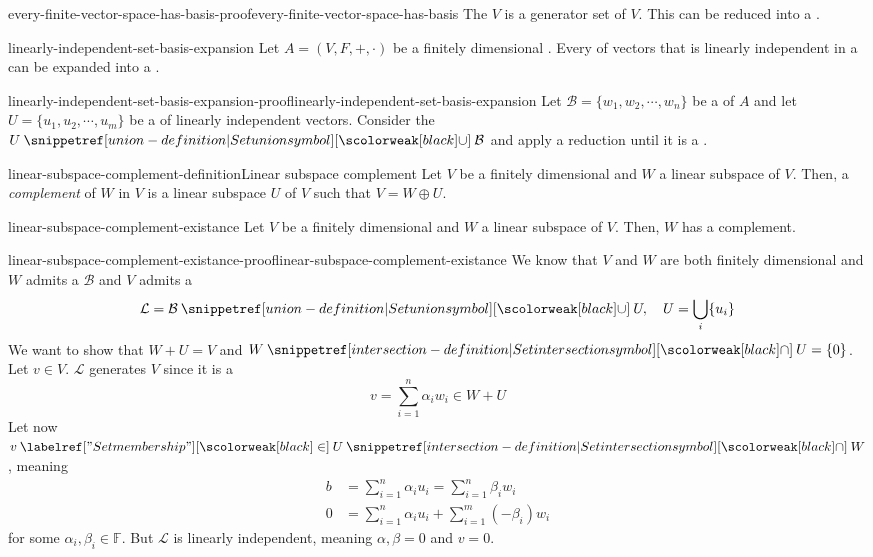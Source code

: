 \documentclass[preview]{standalone}
\begin{document}
\begin{snippetproof}{every-finite-vector-space-has-basis-proof}{every-finite-vector-space-has-basis}{}
    The \set \(V\) is a generator set of \(V\). This \set can be reduced into a \basis.
\end{snippetproof}

\begin{snippetproposition}{linearly-independent-set-basis-expansion}{}
    Let \(A=(V, F, +, \cdot)\) be a finitely dimensional \vectorspace.
    Every \set of vectors that is linearly independent
    in a \vectorspace can be expanded into a \basis.
\end{snippetproposition}

\begin{snippetproof}{linearly-independent-set-basis-expansion-proof}{linearly-independent-set-basis-expansion}{}
    Let \(\mathcal{B} = \{w_1, w_2, \cdots, w_n\}\) be a \basis of \(A\)
    and let \(U = \{u_1, u_2, \cdots, u_m\}\) be a \set of linearly independent vectors.
    Consider the \set \(U \union \mathcal{B}\) and apply a reduction until it is a \basis. 
\end{snippetproof}

\begin{snippetdefinition}{linear-subspace-complement-definition}{Linear subspace complement}
    Let \(V\) be a finitely dimensional \vectorspace and \(W\) a linear subspace of \(V\).
    Then, a \emph{complement} of \(W\) in \(V\) is a linear subspace
    \(U\) of \(V\) such that \(V = W \oplus U\).
\end{snippetdefinition}

\begin{snippetproposition}{linear-subspace-complement-existance}{}
    Let \(V\) be a finitely dimensional \vectorspace and \(W\) a linear subspace of \(V\).
    Then, \(W\) has a complement.
\end{snippetproposition}

\begin{snippetproof}{linear-subspace-complement-existance-proof}{linear-subspace-complement-existance}{}
    We know that \(V\) and \(W\) are both finitely dimensional
    and \(W\) admits a \basis \(\mathcal{B}\) and \(V\) admits a \basis
    \[
        \mathcal{L} = \mathcal{B} \union U, \quad U = \bigcup_i \{u_i\}
    \]
    We want to show that \(W+U=V\) and \(W \intersection U = \{0\}\).
    Let \(v\in V\). \(\mathcal{L}\) generates \(V\) since it is a \basis
    \[
        v = \sum_{i=1}^n \alpha_i w_i \in W + U
    \]
    Let now \(v \in U \intersection W\), meaning
    \begin{align*}
        b &= \sum_{i=1}^n \alpha_i u_i = \sum_{i=1}^n \beta_i w_i \\
        0 &= \sum_{i=1}^n \alpha_i u_i + \sum_{i=1}^m (-\beta_i)w_i
    \end{align*}
    for some \(\alpha_i, \beta_i \in \mathbb{F}\).
    But \(\mathcal{L}\) is linearly independent, meaning \(\alpha, \beta = 0\)
    and \(v=0\).
\end{snippetproof}
\end{document}
